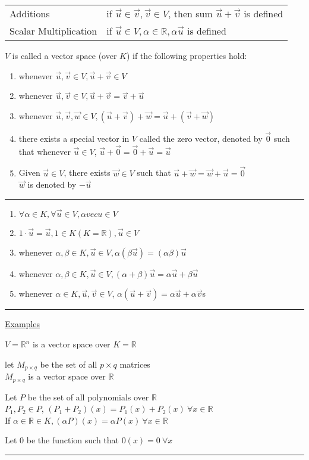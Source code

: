 \documentclass[12pt]{article}
\renewcommand{\v}[1]{\overrightarrow{#1}}
\newcommand{\real}[0]{\mathbb{R}}
\newenvironment{examples}{\shownto{-,compact}\underline{Examples}\enumerate}{\endenumerate\divider\endshownto}
\newcommand{\pp}[1]{\left(#1\right)}
\newcommand{\divider}[0]{\par\textcolor{lightgray}{\rule{\textwidth}{0.1pt}}}
\begin{document}
	\begin{tabular}{@{} l l}
		Additions	& if \(\v{u} \in \v{v}, \v{v} \in V\), then sum \(\v{u} + \v{v}\) is defined \\
		Scalar Multiplication & if \(\v{u} \in V, \alpha \in \real, \alpha \v{u}\) is defined
	\end{tabular}
	
	\(V\) is called a vector space (over \(K\)) if the following properties hold:
	
	\begin{enumerate}[label=\(A_{\arabic*}\)]
		\item whenever \(\v{u}, \v{v} \in V, \v{u} + \v{v} \in V\)
		\item whenever \(\v{u}, \v{v} \in V, \v{u} + \v{v} = \v{v} + \v{u}\)
		\item whenever \(\v{u}, \v{v}, \v{w} \in V, \pp{\v{u} + \v{v}} + \v{w} = \v{u} + \pp{\v{v} + \v{w}}\)
		\item there exists a special vector in \(V\) called the zero vector, denoted by \(\v{0}\) such that whenever \(\v{u} \in V\), \(\v{u} + \v{0} = \v{0} + \v{u} = \v{u}\)
		\item Given \(\v{u} \in V\), there exists \(\v{w} \in V\) such that \(\v{u} + \v{w} = \v{w} + \v{u} = \v{0}\) \\
		\(\v{w}\) is denoted by \(-\v{u}\)
	\end{enumerate}
	
	\divider
	
	\begin{enumerate}[label=\(S_{\arabic*}\)]
		\item \(\forall \alpha \in K, \forall \v{u} \in V, \alpha vec{u} \in V\)
		\item \(1 \cdot \v{u} = \v{u}, 1 \in K(K = \real), \v{u} \in V\)
		\item whenever \(\alpha, \beta \in K, \v{u} \in V, \alpha \pp{\beta \v{u}} = \pp{\alpha \beta} \v{u}\)
		\item whenever \(\alpha, \beta \in K, \v{u} \in V, \pp{\alpha + \beta}\v{u} = \alpha \v{u} + \beta \v{u}\)
		\item whenever \(\alpha \in K, \v{u}, \v{v} \in V\), \(\alpha \pp{\v{u} + \v{v}} = \alpha \v{u} + \alpha \v{v}\)s
	\end{enumerate}
	
	\divider
	
	\begin{examples}
		\item \(V = \real^n\) is a vector space over \(K = \real\)
		\item let \(M_{p \times q}\) be the set of all \(p \times q\) matrices \\
		\(M_{p \times q}\) is a vector space over \(\real\)
		\item Let \(P\) be the set of all polynomials over \(\real\) \\
		\(P_1, P_2 \in P\), \(\pp{P_1 + P_2}(x) = P_1(x) + P_2(x) \ \forall x \in \real\) \\
		If \(\alpha \in \real \in K, \pp{\alpha P}(x) = \alpha P(x) \ \forall x \in \real\)
		\item Let \(0\) be the function such that \(0(x) = 0 \ \forall x\) 
	\end{examples}
	
\end{document}
